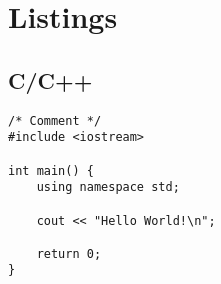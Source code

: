 \documentclass{swddoc}
\begin{document}
\section{Listings}

\subsection{C/C++}

\begin{lstlisting}[style=swd_cpp_lst_style]
/* Comment */
#include <iostream>

int main() {
	using namespace std;

	cout << "Hello World!\n";
	
	return 0;
}
\end{lstlisting}
\end{document}
